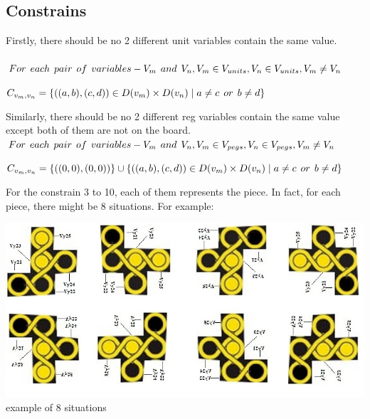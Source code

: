 \subsection{Constrains}
Firstly, there should be no 2 different unit variables contain the same value.\\
\\ 
$For \hspace{1ex} each \hspace{1ex} pair\hspace{1ex} of \hspace{1ex}variables-V_{m} \hspace{1ex} and \hspace{1ex} V_{n}, V_{m} \in V_{units}, V_{n} \in V_{units},V_{m} \neq V_{n}  $
\begin{center}
$C_{v_{m},v_{n}}=\{((a,b),(c,d))\in D(v_{m}) \times D(v_{n})\mid a \neq c   \hspace{1ex} or \hspace{1ex}  b \neq d\}$
\end{center}
Similarly, there should be no 2 different reg variables contain the same value except both of them are not on the board.\\
$For \hspace{1ex} each \hspace{1ex} pair \hspace{1ex} of\hspace{1ex} variables-V_{m}\hspace{1ex} and \hspace{1ex}V_{n}, V_{m} \in V_{pegs}, V_{n} \in V_{pegs}, V_{m} \neq V_{n}$
\begin{center}
$C_{v_{m},v_{n}}=\{((0,0),(0,0))\}\cup \{((a,b),(c,d))\in D(v_{m})\times D(v_{n})\mid a \neq c   \hspace{1ex} or \hspace{1ex}  b \neq d\}$\\
\end{center}
For the constrain 3 to 10, each of them represents the piece. In fact, for each piece, there might be 8 situations. For example:
\begin{center}
\includegraphics[scale=0.5]{domainexplain.jpg}\\
example of 8 situations
\end{center}
